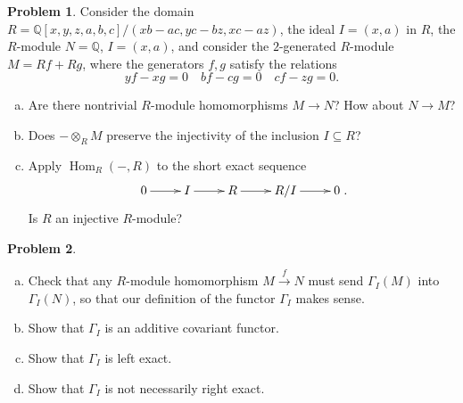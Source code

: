 \documentclass[11pt]{article}
\DeclareMathOperator{\Hom}{Hom}
\theoremstyle{definition}
\newtheorem{problem}{Problem}
\begin{document}
\begin{problem}
	Consider the domain $R = \mathbb{Q}[x,y,z,a,b,c]/(xb-ac,yc-bz,xc-az)$, the ideal $I = (x,a)$ in $R$, the $R$-module $N = \mathbb{Q}$, $I = (x,a)$, and consider the $2$-generated $R$-module $M = Rf + Rg$, where the generators $f, g$ satisfy the relations 
		$$yf-xg = 0 \quad bf - cg = 0 \quad cf - zg = 0.$$
			\begin{enumerate}[a)]
		\item Are there nontrivial $R$-module homomorphisms $M \longrightarrow N$? How about $N \longrightarrow M$?
		\item Does $- \otimes_R M$ preserve the injectivity of the inclusion $I \subseteq R$?
		\item Apply $\Hom_R(-,R)$ to the short exact sequence 
		$$\xymatrix{0 \ar[r] & I \ar[r] & R \ar[r] & R/I \ar[r] & 0}.$$
		Is $R$ an injective $R$-module?
		\end{enumerate}
\end{problem}






\vspace{3em}

\noindent
{} 
	
	

\begin{problem}$\,$
	\begin{enumerate}[a)]
		\item Check that any $R$-module homomorphism $M \xrightarrow{f} N$ must send $\Gamma_I(M)$ into $\Gamma_I(N)$, so that our definition of the functor $\Gamma_I$ makes sense.
		\item Show that $\Gamma_I$ is an additive covariant functor.
		\item Show that $\Gamma_I$ is left exact.
		\item Show that $\Gamma_I$ is not necessarily right exact.
	\end{enumerate}
\end{problem}
\end{document}
